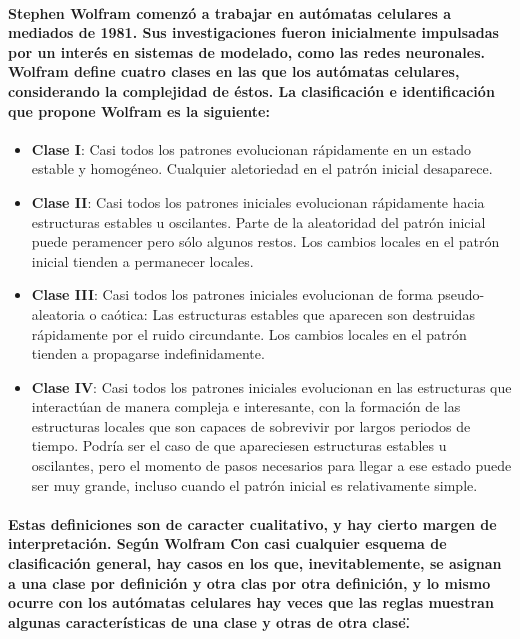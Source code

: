     \paragraph{Stephen Wolfram comenzó a trabajar en autómatas celulares a mediados de 1981. Sus investigaciones fueron inicialmente impulsadas por un interés en sistemas de modelado, como las redes neuronales. Wolfram define cuatro clases en las que los autómatas celulares, considerando la complejidad de éstos. La clasificación e identificación que propone Wolfram es la siguiente:}
      \begin{itemize}
        \item{\textbf{Clase I}: Casi todos los patrones evolucionan rápidamente en un estado estable y homogéneo. Cualquier aletoriedad en el patrón inicial desaparece.}
        \item{\textbf{Clase II}: Casi todos los patrones iniciales evolucionan rápidamente hacia estructuras estables u oscilantes. Parte de la aleatoridad del patrón inicial puede peramencer pero sólo algunos restos. Los cambios locales en el patrón inicial tienden a permanecer locales.}
        \item{\textbf{Clase III}: Casi todos los patrones iniciales evolucionan de forma pseudo-aleatoria o caótica: Las estructuras estables que aparecen son destruidas rápidamente por el ruido circundante. Los cambios locales en el patrón tienden a propagarse indefinidamente.}
        \item{\textbf{Clase IV}: Casi todos los patrones iniciales evolucionan en las estructuras que interactúan de manera compleja e interesante, con la formación de las estructuras locales que son capaces de sobrevivir por largos periodos de tiempo. Podría ser el caso de que apareciesen estructuras estables u oscilantes, pero el momento de pasos necesarios para llegar a ese estado puede ser muy grande, incluso cuando el patrón inicial es relativamente simple.}
      \end{itemize}
    \paragraph{Estas definiciones son de caracter cualitativo, y hay cierto margen de interpretación. Según Wolfram \"Con casi cualquier esquema de clasificación general, hay casos en los que, inevitablemente, se asignan a una clase por definición y otra clas por otra definición, y lo mismo ocurre con los autómatas celulares\: hay veces que las reglas muestran algunas características de una clase y otras de otra clase\".\cite{11}}